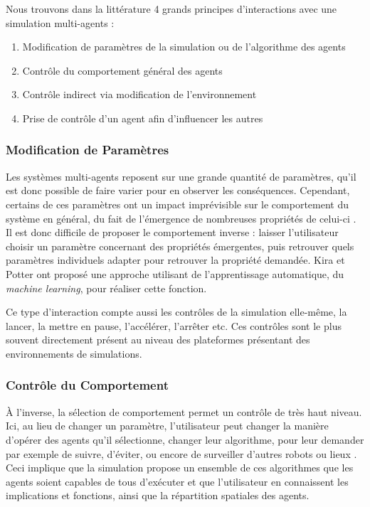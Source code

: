 	
		Nous trouvons dans la littérature 4 grands principes d'interactions avec une simulation multi-agents \cite{kolling_human_2016} :
		\begin{enumerate}
			\item Modification de paramètres de la simulation ou de l'algorithme des agents
			\item Contrôle du comportement général des agents
			\item Contrôle indirect via modification de l'environnement
			\item Prise de contrôle d'un agent afin d'influencer les autres
		\end{enumerate}
		
		
	\subsubsection{Modification de Paramètres}
	Les systèmes multi-agents reposent sur une grande quantité de paramètres, qu'il est donc possible de faire varier pour en observer les conséquences. Cependant, certains de ces paramètres ont un impact imprévisible sur le comportement du système en général, du fait de l'émergence de nombreuses propriétés de celui-ci \cite{couzin_collective_2002}. Il est donc difficile de proposer le comportement inverse : laisser l'utilisateur choisir un paramètre concernant des propriétés émergentes, puis retrouver quels paramètres individuels adapter pour retrouver la propriété demandée. Kira et Potter \cite{kira_exerting_2009} ont proposé une approche utilisant de l'apprentissage automatique, du \textit{machine learning}, pour réaliser cette fonction.
	
	Ce type d'interaction compte aussi les contrôles de la simulation elle-même, la lancer, la mettre en pause, l'accélérer, l'arrêter etc. Ces contrôles sont le plus souvent directement présent au niveau des plateformes présentant des environnements de simulations.
		
	\subsubsection{Contrôle du Comportement}
	À l'inverse, la sélection de comportement permet un contrôle de très haut niveau. Ici, au lieu de changer un paramètre, l'utilisateur peut changer la manière d'opérer des agents qu'il sélectionne, changer leur algorithme, pour leur demander par exemple de suivre, d'éviter, ou encore de surveiller d'autres robots ou lieux \cite{coppin_controlling_2012}. Ceci implique que la simulation propose un ensemble de ces algorithmes que les agents soient capables de tous d'exécuter et que l'utilisateur en connaissent les implications et fonctions, ainsi que la répartition spatiales des agents.
	
